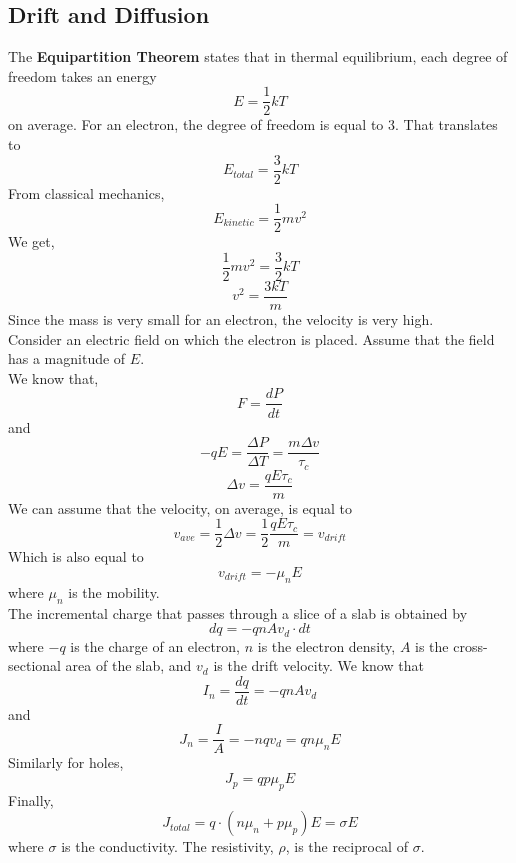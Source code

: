 \documentclass{article}
\begin{document}
\subsection{Drift and Diffusion}
\noindent 
The \textbf{Equipartition Theorem} states that in thermal equilibrium, each
degree of freedom takes an energy $$E = \frac{1}{2}kT$$ on average. For an electron, 
the degree of freedom is equal to 3. That translates to $$E_{total} = \frac{3}{2}kT$$
From classical mechanics, $$E_{kinetic}=\frac{1}{2}mv^2$$ 
We get, $$\frac{1}{2}mv^2 = \frac{3}{2}kT$$ $$v^2 = \frac{3kT}{m}$$ Since the mass 
is very small for an electron, the velocity is very high. 
\vspace{8pt}
\\ Consider an electric field on which the electron is placed. Assume that the field 
has a magnitude of $E$. 
\vspace{8pt}
\\We know that, $$F = \frac{dP}{dt}$$ and $$-qE = \frac{\Delta P}{\Delta T} 
= \frac{m\Delta v}{\tau_{c}}$$ $$\boxed{\Delta v = \frac{qE \tau_c}{m}}$$ We can assume 
that the velocity, on average, is equal to $$\boxed{v_{ave} = \frac{1}{2} \Delta v = 
\frac{1}{2} \frac{qE \tau_c}{m} = v_{drift}}$$
Which is also equal to $$\boxed{v_{drift} = -\mu_n E}$$ where $\mu_n$ is the mobility.
\vspace{8pt}
\\ The incremental charge that passes through a slice of a slab is obtained by 
$$dq = -qnAv_d \cdot dt$$
where $-q$ is the charge of an electron, $n$ is the electron density, $A$ is the 
cross-sectional area of the slab, and $v_d$ is the drift velocity. We know that 
$$I_n = \frac{dq}{dt} = -qnAv_{d}$$ and $$J_n = \frac{I}{A} =-nqv_d = qn\mu_n E$$
Similarly for holes, $$J_p = qp\mu_p E$$
Finally, $$\boxed{J_{total} = q\cdot(n\mu_n + p\mu_p)E = \sigma E}$$
where $\sigma$ is the conductivity. The resistivity, $\rho$, is the reciprocal of $\sigma$.

\newpage 
\end{document}
